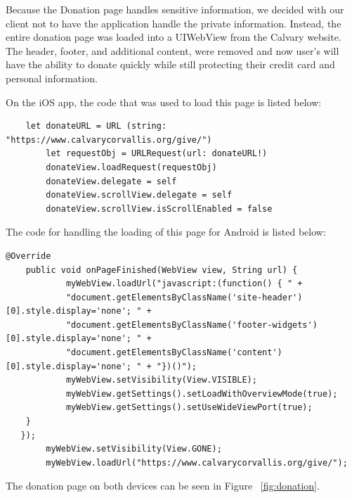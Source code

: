 \documentclass[letterpaper,10pt,draftclsnofoot,onecolumn,titlepage]{IEEEtran}
\begin{document}
		Because the Donation page handles sensitive information, we decided with our client not to have the application handle the private information.
		Instead, the entire donation page was loaded into a UIWebView from the Calvary website.
		The header, footer, and additional content, were removed and now user's will have the ability to donate quickly while still protecting their credit card and personal information.

		On the iOS app, the code that was used to load this page is listed below:
		\begin{lstlisting}
 	let donateURL = URL (string: "https://www.calvarycorvallis.org/give/")
        let requestObj = URLRequest(url: donateURL!)
        donateView.loadRequest(requestObj)      
        donateView.delegate = self     
        donateView.scrollView.delegate = self     
        donateView.scrollView.isScrollEnabled = false
        	\end{lstlisting}


		The code for handling the loading of this page for Android is listed below:
		\begin{lstlisting}
@Override
    public void onPageFinished(WebView view, String url) {
            myWebView.loadUrl("javascript:(function() { " +
            "document.getElementsByClassName('site-header')[0].style.display='none'; " +
            "document.getElementsByClassName('footer-widgets')[0].style.display='none'; " +
            "document.getElementsByClassName('content')[0].style.display='none'; " + "})()");
            myWebView.setVisibility(View.VISIBLE);
            myWebView.getSettings().setLoadWithOverviewMode(true);
            myWebView.getSettings().setUseWideViewPort(true);
   	}
   });
        myWebView.setVisibility(View.GONE);
        myWebView.loadUrl("https://www.calvarycorvallis.org/give/");
        		\end{lstlisting}

		The donation page on both devices can be seen in Figure ~\ref{fig:donation}.
\end{document}
